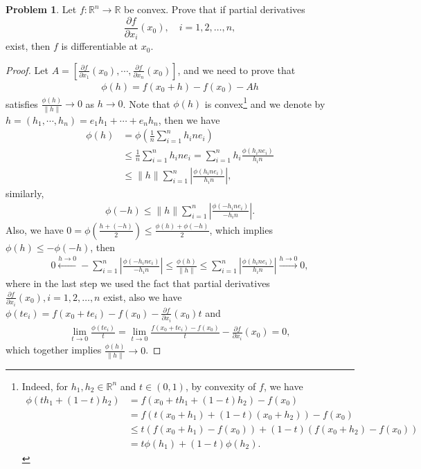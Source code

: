 \documentclass[11pt]{article}
\theoremstyle{definition}
\newtheorem{problem}{Problem}
\theoremstyle{definition}
\begin{document}
\begin{problem}
Let $f:\mathbb{R}^n\to\mathbb{R}$ be convex. Prove that if partial derivatives
$$
\frac{\partial f}{\partial x_i}(x_0),
\quad i=1,2,\ldots,n,
$$
exist, then $f$ is differentiable at $x_0$.
\end{problem}
\begin{proof}
Let $A = \left[\frac{\partial f}{\partial x_1}(x_0), \cdots, \frac{\partial f}{\partial x_n}(x_0)\right]$, and we need to prove that 
\begin{align*}
    \phi(h) = f(x_0+h) - f(x_0) - Ah
\end{align*}
satisfies $\frac{\phi(h)}{\|h\|} \to 0$ as $h \to 0$. Note that $\phi(h)$ is convex\footnote{Indeed, for $h_1, h_2 \in \mathbb{R}^n$ and $t \in (0,1)$, by convexity of $f$, we have
\begin{align*}
    \phi(th_1 + (1-t)h_2) & = f(x_0 + th_1 + (1-t)h_2) - f(x_0) \\
    & = f(t(x_0+h_1) + (1-t)(x_0+h_2)) - f(x_0) \\
    & \leq t \left(f(x_0+h_1) - f(x_0) \right) + (1-t) \left(f(x_0+h_2) - f(x_0) \right) \\
    & = t\phi(h_1) + (1-t)\phi(h_2).
\end{align*}} and we denote by $h = \left(h_1, \cdots, h_n \right) = e_1 h_1 + \cdots + e_n h_n$, then we have 
\begin{align*}
    \phi(h) & = \phi \left(\frac{1}{n} \sum^n_{i=1} h_i n e_i \right) \\
    & \leq \frac{1}{n}\sum^n_{i=1} h_i n e_i = \sum^n_{i=1} h_i \frac{\phi(h_i n e_i)}{h_i n} \\
    & \leq \|h\| \sum^n_{i=1} \left|\frac{\phi(h_i n e_i)}{h_i n}\right|,
\end{align*}
similarly, 
\begin{align*}
    \phi(-h) \leq \|h\| \sum^n_{i=1} \left|\frac{\phi( - h_i n e_i)}{ - h_i n}\right|.
\end{align*}
Also, we have $0 = \phi \left(\frac{h + (-h)}{2}\right) \leq \frac{\phi(h) + \phi(-h)}{2}$, which implies $\phi(h) \leq - \phi(-h)$, then 
\begin{align*}
    0 \xleftarrow{h \to 0} - \sum^n_{i=1} \left|\frac{\phi( - h_i n e_i)}{ - h_i n}\right| \leq \frac{\phi(h)}{\|h\|} \leq \sum^n_{i=1} \left|\frac{\phi( h_i n e_i)}{ h_i n}\right| \xrightarrow{h \to 0} 0,
\end{align*}
where in the last step we used the fact that partial derivatives $\frac{\partial f}{\partial x_i}(x_0), i=1,2,\ldots,n$ exist, also we have $\phi(t e_i) = f(x_0+t e_i) - f(x_0) - \frac{\partial f}{\partial x_i}(x_0)t$ and 
\begin{align*}
    \lim_{t\to 0}\frac{\phi(t e_i)}{t} = \lim_{t\to 0} \frac{f(x_0+t e_i) - f(x_0)}{t} - \frac{\partial f}{\partial x_i}(x_0) = 0,
\end{align*}
which together implies $\frac{\phi(h)}{\|h\|} \to 0$.
\end{proof}
\end{document}
